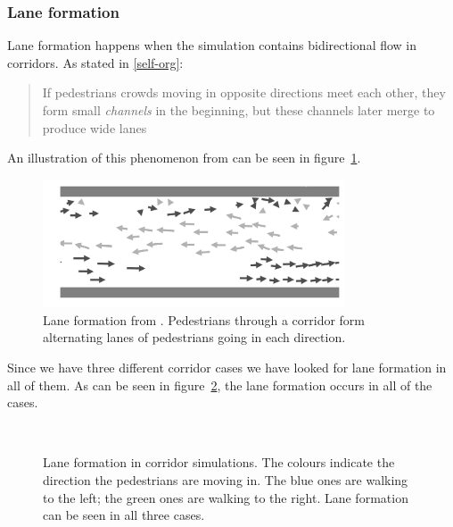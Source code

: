 \subsubsection{Lane formation}
Lane formation happens when the simulation contains bidirectional flow in 
corridors. As stated in \ref{self-org}:

\begin{quote}
    If pedestrians crowds moving in opposite directions meet each other, they 
    form small \emph{channels} in the beginning, but these channels later 
    merge to produce wide lanes
\end{quote}

An illustration of this phenomenon from \cite{lanes} can be seen in 
figure~\ref{fig:lanes-literature}. 

\begin{figure}[h]
    \centering
    \includegraphics[width=0.8\textwidth]{Figures/flow_lanes_litterature.png}
    \caption[Lane formation from \cite{lanes}]{Lane formation from 
    \cite{lanes}. Pedestrians through a corridor form alternating lanes of 
    pedestrians going in each direction.}
    \label{fig:lanes-literature}
\end{figure}

Since we have three different corridor cases we have looked for lane
formation in all of them. As can be seen in figure~\ref{fig:laneformation}, 
the lane formation occurs in all of the cases.

\begin{figure}[h]
    \centering
    \\
    \caption[Lane formation in corridor simulations]{Lane formation in 
    corridor simulations. The colours indicate the direction the pedestrians 
    are moving in. The blue ones are walking to the left; the green ones 
    are walking to the right. Lane formation can be seen in all three cases. }
    \label{fig:laneformation}
\end{figure}

